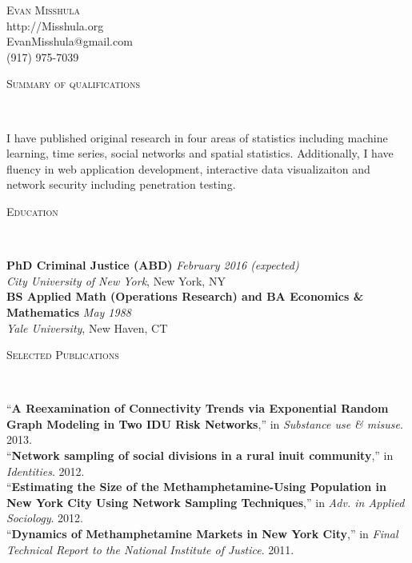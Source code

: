 \documentclass[9pt]{article}
\newenvironment{changemargin}[2]{%
  \begin{list}{}{%
    \setlength{\topsep}{0pt}%
    \setlength{\leftmargin}{#1}%
    \setlength{\rightmargin}{#2}%
    \setlength{\listparindent}{\parindent}%
    \setlength{\itemindent}{\parindent}%
    \setlength{\parsep}{\parskip}%
  }%
  \item[]}{\end{list}
}
\newcommand{\lineover}{
	\begin{changemargin}{-0.05in}{-0.05in}
		\vspace*{-8pt}
		\hrulefill \\
		\vspace*{-2pt}
	\end{changemargin}
}
\newcommand{\header}[1]{
	\begin{changemargin}{-0.5in}{-0.5in}
		\scshape{#1}\\
  	\lineover
	\end{changemargin}
}
\newcommand{\contact}[4]{
	\begin{changemargin}{-0.5in}{-0.5in}
		\begin{center}
			{\Large \scshape {#1}}\\ \smallskip
			{#2}\\ \smallskip 
			{#3}\\ \smallskip
			{#4}\smallskip
		\end{center}
	\end{changemargin}
}
\newenvironment{body} {
	\vspace*{-16pt}
	\begin{changemargin}{-0.25in}{-0.5in}
  }	
	{\end{changemargin}
}
\begin{document}
\contact{Evan Misshula}
{http://Misshula.org}{EvanMisshula@gmail.com}
{(917) 975-7039}


\header{Summary of qualifications}

\begin{body}
  \vspace{14pt} I have published original research in four areas of
  statistics including machine learning, time series, social networks
  and spatial statistics.  Additionally, I have fluency in web
  application development, interactive data visualizaiton and network
  security including penetration testing.
\end{body}

\smallskip


\header{Education}

\begin{body}
	\vspace{14pt}
	\textbf{PhD Criminal Justice (ABD)}{} \hfill \emph{February 2016 (expected)}{} \\
	\vspace*{-4pt}
	\emph{City University of New York}, New York, NY{} \\
  \medskip
	\textbf{BS Applied Math 
(Operations Research) and BA Economics \& Mathematics} \hfill \emph{May 1988} \\
	\emph{Yale University}, New Haven, CT\\
\end{body}

\smallskip


\header{Selected Publications}

\begin{body}
	\vspace{14pt}
	``\textbf{A Reexamination of Connectivity Trends via Exponential Random Graph Modeling in Two IDU Risk Networks},'' in \emph{Substance use \& misuse}. 2013.\\
	\smallskip
	``\textbf{Network sampling of social divisions in a rural inuit community},'' in \emph{Identities}. 2012.\\
	\smallskip
	``\textbf{Estimating the Size of the Methamphetamine-Using Population in New York City Using Network Sampling Techniques},'' in \emph{Adv. in Applied Sociology}. 2012.\\
	\smallskip
	``\textbf{Dynamics of Methamphetamine Markets in New York City},'' in \emph{Final Technical Report to the National Institute of Justice}. 2011.\\
\end{body}
\end{document}
